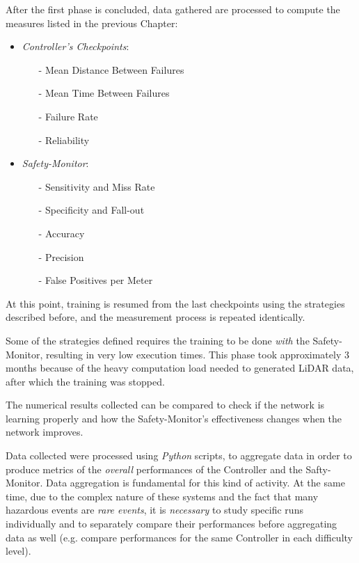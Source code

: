 After the first phase is concluded, data gathered are processed to compute the measures listed in the previous Chapter:

\begin{itemize}
	\item \textsl{Controller's Checkpoints}:
	\begin{itemize}
		\item[-] Mean Distance Between Failures
		\item[-] Mean Time Between Failures
		\item[-] Failure Rate
		\item[-] Reliability
	\end{itemize}
	\item \textsl{Safety-Monitor}:
	\begin{itemize}
		\item[-] Sensitivity and Miss Rate
		\item[-] Specificity and Fall-out
		\item[-] Accuracy
		\item[-] Precision
		\item[-] False Positives per Meter
	\end{itemize}
\end{itemize}

At this point, training is resumed from the last checkpoints using the strategies described before, and the measurement process is repeated identically.

Some of the strategies defined requires the training to be done \textsl{with} the Safety-Monitor, resulting in very low execution times. This phase took approximately 3 months because of the heavy computation load needed to generated LiDAR data, after which the training was stopped.

The numerical results collected can be compared to check if the network is learning properly and how the Safety-Monitor's effectiveness changes when the network improves.

Data collected were processed using \textsl{Python} scripts, to aggregate data in order to produce metrics of the \textsl{overall} performances of the Controller and the Safty-Monitor.
Data aggregation is fundamental for this kind of activity. At the same time, due to the complex nature of these systems and the fact that many hazardous events are \textsl{rare events}, it is \textsl{necessary} to study specific runs individually and to separately compare their performances before aggregating data as well (e.g. compare performances for the same Controller in each difficulty level).

